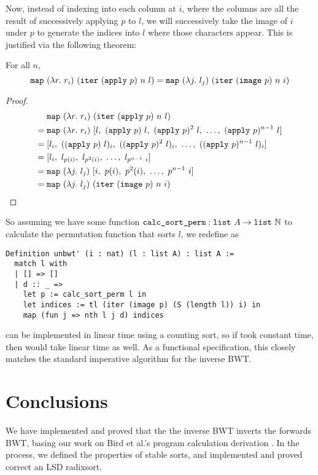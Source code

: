 \documentclass[sigplan,10pt,anonymous,review]{thesis}
\begin{document}
Now, instead of indexing into each column at $i$, where the columns
are all the result of successively applying $p$ to $l$, we will
successively take the image of $i$ under $p$ to generate the indices
into $l$ where those characters appear. This is justified via the
following theorem:
\begin{theorem}
  For all $n$,
  \begin{equation*}
  \texttt{map}~(\lambda r.~r_i)~(\texttt{iter}~(\texttt{apply}~p)~n~l)
  =
  \texttt{map}~(\lambda j.~l_j)~(\texttt{iter}~(\texttt{image}~p)~n~i)
  \end{equation*}
\end{theorem}
\begin{proof}
  \begin{align*}
       & \texttt{map}~(\lambda r.~r_i)~(\texttt{iter}~(\texttt{apply}~p)~n~l) \\
    ={}& \texttt{map}~(\lambda r.~r_i)~[l,~(\texttt{apply}~p)~l,~(\texttt{apply}~p)^2~l,~\ldots,~(\texttt{apply}~p)^{n-1}~l] \\
    ={}& [l_i,~((\texttt{apply}~p)~l)_i,~((\texttt{apply}~p)^2~l)_i,~\ldots,~((\texttt{apply}~p)^{n-1}~l)_i] \\
    ={}& [l_i,~l_{p(i)},~l_{p^2(i)},~\ldots,~l_{p^{n-1}~i}] \\
    ={}& \texttt{map}~(\lambda j.~l_j)~[i,~p(i),~p^2(i),~\ldots,~p^{n-1}~i] \\
    ={}& \texttt{map}~(\lambda j.~l_j)~(\texttt{iter}~(\texttt{image}~p)~n~i) \qedhere
  \end{align*}
\end{proof}

So assuming we have some function $\texttt{calc\_sort\_perm} :
\texttt{list}~A \to \texttt{list}~\mathbb{N}$ to calculate the permutation
function that sorts $l$, we redefine  as
\begin{lstlisting}
Definition unbwt' (i : nat) (l : list A) : list A :=
  match l with
  | [] => []
  | d :: _ =>
    let p := calc_sort_perm l in
    let indices := tl (iter (image p) (S (length l)) i) in
    map (fun j => nth l j d) indices
\end{lstlisting}
 can be implemented in linear time using a
counting sort, so if  took constant time, then 
would take linear time as well. As a functional specification, this
closely matches the standard imperative algorithm for the inverse BWT.

\section{Conclusions}
We have implemented and proved that the the inverse BWT inverts the
forwards BWT, basing our work on Bird et al.'s program calculation
derivation \cite{birdmu,pearls}. In the process, we defined the
properties of stable sorts, and implemented and proved correct an LSD
radixsort.
\end{document}
